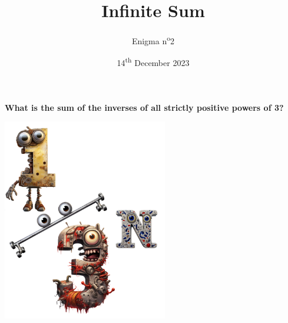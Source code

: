 \documentclass[a4paper, top=10mm]{article}
\title{\textbf{\huge{Infinite Sum}}}
\author{Enigma n\textsuperscript{o}2}
\date{14\textsuperscript{th} December 2023}
\begin{document}
	\maketitle
	
	\vspace{3cm}
	
	\Huge{\textbf{What is the sum of the inverses of all strictly positive powers of 3?}}
	
	\begin{center}
		\includegraphics[height=250pt]{02_one_third_character.png}
	\end{center}
	
	
\end{document}
